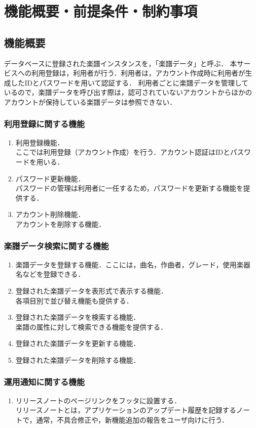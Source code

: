 \chapter{機能概要・前提条件・制約事項}
\section{機能概要}
データベースに登録された楽譜インスタンスを，「楽譜データ」と呼ぶ．
本サービスへの利用登録は，利用者が行う．利用者は，アカウント作成時に利用者が生成したIDとパスワードを用いて認証する．
利用者ごとに楽譜データを管理しているので，楽譜データを呼び出す際は，認可されていないアカウントからほかのアカウントが保持している楽譜データは参照できない．
\subsection{利用登録に関する機能}
\begin{enumerate}
      \item 利用登録機能．\\
            ここでは利用登録（アカウント作成）を行う．アカウント認証はIDとパスワードを用いる．
      \item パスワード更新機能．\\
            パスワードの管理は利用者に一任するため，パスワードを更新する機能を提供する．
      \item アカウント削除機能．\\
            アカウントを削除する機能．
\end{enumerate}
\subsection{楽譜データ検索に関する機能}
\begin{enumerate}
      \item 楽譜データを登録する機能．ここには，曲名，作曲者，グレード，使用楽器名などを登録できる．
      \item 登録された楽譜データを表形式で表示する機能．\\
            各項目別で並び替え機能も提供する．
      \item 登録された楽譜データを検索する機能．\\
            楽譜の属性に対して検索できる機能を提供する．
      \item 登録された楽譜データを更新する機能．
      \item 登録された楽譜データを削除する機能．
\end{enumerate}
\subsection{運用通知に関する機能}
\begin{enumerate}
      \item リリースノートのページリンクをフッタに設置する．\\
            リリースノートとは，アプリケーションのアップデート履歴を記録するノートで，通常，不具合修正や，新機能追加の報告をユーザ向けに行う．
\end{enumerate}
